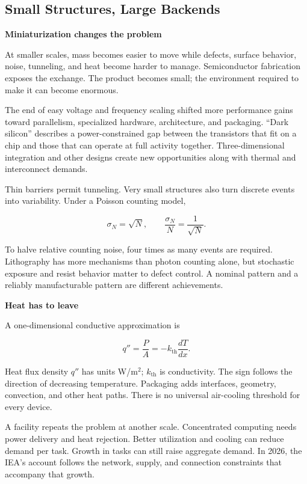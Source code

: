 \documentclass[11pt,openany]{book}
\newcommand{\subhead}[1]{\par\medskip\noindent\textbf{#1}\par\nobreak\smallskip}
\begin{document}
\subsection{Small Structures, Large Backends}

\subhead{Miniaturization changes the problem}

At smaller scales, mass becomes easier to move while defects, surface behavior, noise, tunneling, and heat become harder to manage. Semiconductor fabrication exposes the exchange. The product becomes small; the environment required to make it can become enormous.

The end of easy voltage and frequency scaling shifted more performance gains toward parallelism, specialized hardware, architecture, and packaging. “Dark silicon” describes a power-constrained gap between the transistors that fit on a chip and those that can operate at full activity together.\cite{esmaeilzadeh2011dark} Three-dimensional integration and other designs create new opportunities along with thermal and interconnect demands.

Thin barriers permit tunneling. Very small structures also turn discrete events into variability. Under a Poisson counting model,

\begin{equation}
\sigma_N=\sqrt N,\qquad \frac{\sigma_N}{N}=\frac{1}{\sqrt N}.
\end{equation}

To halve relative counting noise, four times as many events are required. Lithography has more mechanisms than photon counting alone, but stochastic exposure and resist behavior matter to defect control.\cite{debisschop2018stochastic} A nominal pattern and a reliably manufacturable pattern are different achievements.

\subhead{Heat has to leave}

A one-dimensional conductive approximation is

\begin{equation}
q''=\frac{P}{A}=-k_{\mathrm{th}}\frac{dT}{dx}.
\end{equation}

Heat flux density $q''$ has units W/m$^2$; $k_{\mathrm{th}}$ is conductivity. The sign follows the direction of decreasing temperature. Packaging adds interfaces, geometry, convection, and other heat paths. There is no universal air-cooling threshold for every device.

A facility repeats the problem at another scale. Concentrated computing needs power delivery and heat rejection. Better utilization and cooling can reduce demand per task.\cite{masanet2020recalibrating} Growth in tasks can still raise aggregate demand. In 2026, the IEA's account follows the network, supply, and connection constraints that accompany that growth.\cite{iea2026powering}
\end{document}
